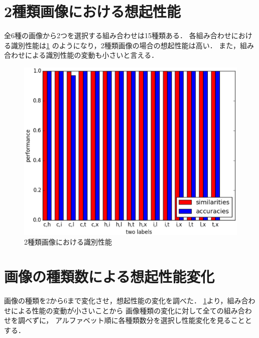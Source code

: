 \documentclass[10pt,twocolumn]{jarticle}
\newcommand{\figref}[1]{\figurename\ref{fig:#1}}
\begin{document}
\section{2種類画像における想起性能}\label{sec:two-label-performance}
全6種の画像から2つを選択する組み合わせは15種類ある．
各組み合わせにおける識別性能は\figref{two-label-performance}
のようになり，2種類画像の場合の想起性能は高い．
また，組み合わせによる識別性能の変動も小さいと言える．
\begin{figure}[htpb]
  \centering
    \includegraphics[width=\columnwidth]{figs/two_label_performance}
    \caption{2種類画像における識別性能}
    \label{fig:two-label-performance}
\end{figure}


\section{画像の種類数による想起性能変化}
画像の種類を2から6まで変化させ，想起性能の変化を調べた．
\ref{sec:two-label-performance}より，組み合わせによる性能の変動が小さいことから
画像種類の変化に対して全ての組み合わせを調べずに，
アルファベット順に各種類数分を選択し性能変化を見ることとする．
\end{document}
